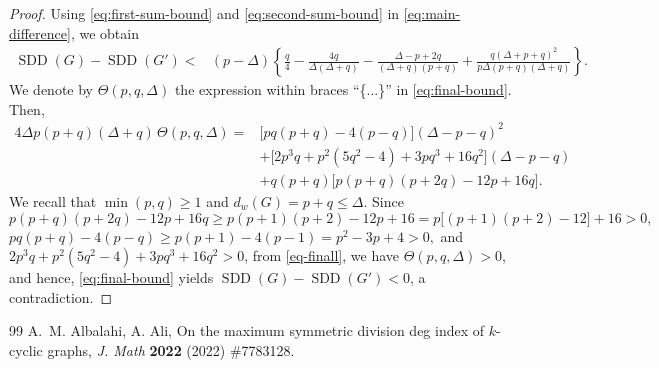 \documentclass[10pt,a4paper]{amsart}
\newcommand{\SDD}{\operatorname{SDD}}
\begin{document}
\begin{proof}
Using \eqref{eq:first-sum-bound} and \eqref{eq:second-sum-bound} in
\eqref{eq:main-difference}, we obtain \begin{align}
\SDD(G)-\SDD(G')
<{}&(p-\Delta)\left\{
\frac q4-\frac{4q}{\Delta(\Delta+q)}
-\frac{\Delta-p+2q}{(\Delta+q)(p+q)}
+\frac{q(\Delta+p+q)^2}{p\Delta (p+q)(\Delta+q)}
\right\}.
\label{eq:final-bound}
\end{align}
We denote by  $\Theta(p,q,\Delta)$ the expression within braces ``\{...\}'' in
\eqref{eq:final-bound}.
Then,
\begin{align}\label{eq-finall}
4\Delta p(p+q)(\Delta+q)\,\Theta(p,q,\Delta)
={}&\bigl[pq(p+q)-4(p-q)\bigr](\Delta-p-q)^2\nonumber\\
&+\bigl[2p^3q+p^2(5q^2-4)+3pq^3+16q^2\bigr]
(\Delta-p-q)\nonumber\\
&+q(p+q)\bigl[p(p+q)(p+2q)-12p+16q\bigr].
\end{align}
We recall that $\min(p,q)\ge1$ and $d_w(G)=p+q\le\Delta$. Since
\[
p(p+q)(p+2q)-12p+16q
\ge p(p+1)(p+2)-12p+16=p\bigl[(p+1)(p+2)-12\bigr]+16>0,
\]
$pq(p+q)-4(p-q)
\ge p(p+1)-4(p-1)
=p^2-3p+4>0,$ and $2p^3q+p^2(5q^2-4)+3pq^3+16q^2>0$,
from \eqref{eq-finall}, we have $\Theta(p,q,\Delta)>0$, and hence, \eqref{eq:final-bound} yields $\SDD(G)-\SDD(G')<0$, a contradiction.
\end{proof}

\begin{thebibliography}{99}
 A.~M. Albalahi, A. Ali, On the maximum symmetric division deg index of $k$-cyclic graphs, \emph{J. Math} \textbf{2022} (2022) \#7783128.
\end{thebibliography}
\end{document}
